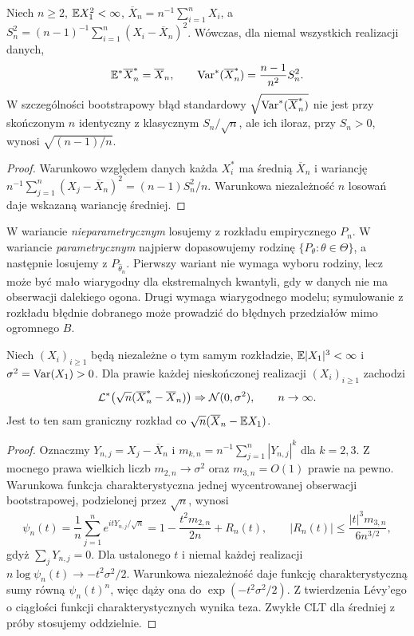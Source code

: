 \begin{twierdzenie}
\label{thm:bootstrap-mean-variance}
Niech $n\ge2$, $\mathbb E X_1^2<\infty$,
$\overline X_n=n^{-1}\sum_{i=1}^nX_i$, a
$S_n^2=(n-1)^{-1}\sum_{i=1}^n(X_i-\overline X_n)^2$.
Wówczas, dla niemal wszystkich realizacji danych,
\[
 \mathbb E^*\overline X_n^*=\overline X_n,\qquad
 \operatorname{Var}^*(\overline X_n^*)=\frac{n-1}{n^2}S_n^2.
\]
W szczególności bootstrapowy błąd standardowy $\sqrt{\operatorname{Var}^*(\overline X_n^*)}$
nie jest przy skończonym $n$ identyczny z klasycznym $S_n/\sqrt n$,
ale ich iloraz, przy $S_n>0$, wynosi $\sqrt{(n-1)/n}$.
\end{twierdzenie}
\begin{proof}
Warunkowo względem danych każda $X_i^*$ ma średnią
$\overline X_n$ i wariancję
$n^{-1}\sum_{j=1}^n(X_j-\overline X_n)^2=(n-1)S_n^2/n$.
Warunkowa niezależność $n$ losowań daje wskazaną wariancję średniej.
\end{proof}

\begin{uwaga}
W wariancie \emph{nieparametrycznym} losujemy z rozkładu empirycznego $P_n$.
W wariancie \emph{parametrycznym} najpierw dopasowujemy rodzinę
$\{P_\theta:\theta\in\Theta\}$, a następnie losujemy z
$P_{\widehat\theta_n}$. Pierwszy wariant nie wymaga wyboru rodziny,
lecz może być mało wiarygodny dla ekstremalnych kwantyli,
gdy w danych nie ma obserwacji dalekiego ogona. Drugi wymaga
wiarygodnego modelu; symulowanie z rozkładu błędnie dobranego
może prowadzić do błędnych przedziałów mimo ogromnego $B$.
\end{uwaga}

\begin{twierdzenie}
\label{thm:bootstrap-clt}
Niech $(X_i)_{i\ge1}$ będą niezależne o tym samym rozkładzie,
$\mathbb E|X_1|^3<\infty$ i $\sigma^2=\operatorname{Var}(X_1)>0$.
Dla prawie każdej nieskończonej realizacji $(X_i)_{i\ge1}$ zachodzi
\[
 \mathcal L^*\bigl(\sqrt n(\overline X_n^*-\overline X_n)\bigr)
 \Rightarrow\mathcal N(0,\sigma^2),\qquad n\to\infty.
\]
Jest to ten sam graniczny rozkład co $\sqrt n(\overline X_n-\mathbb E X_1)$.
\end{twierdzenie}
\begin{proof}
Oznaczmy $Y_{n,j}=X_j-\overline X_n$ i
$m_{k,n}=n^{-1}\sum_{j=1}^n|Y_{n,j}|^k$ dla $k=2,3$.
Z mocnego prawa wielkich liczb $m_{2,n}\to\sigma^2$
oraz $m_{3,n}=O(1)$ prawie na pewno.
Warunkowa funkcja charakterystyczna jednej wycentrowanej
obserwacji bootstrapowej, podzielonej przez $\sqrt n$, wynosi
\[
 \psi_n(t)=\frac1n\sum_{j=1}^n
 e^{itY_{n,j}/\sqrt n}
 =1-\frac{t^2m_{2,n}}{2n}+R_n(t),\qquad
 |R_n(t)|\le \frac{|t|^3m_{3,n}}{6n^{3/2}},
\]
gdyż $\sum_jY_{n,j}=0$. Dla ustalonego $t$ i niemal każdej
realizacji $n\log\psi_n(t)\to-t^2\sigma^2/2$.
Warunkowa niezależność daje funkcję charakterystyczną sumy
równą $\psi_n(t)^n$, więc dąży ona do
$\exp(-t^2\sigma^2/2)$. Z twierdzenia Lévy'ego
o ciągłości funkcji charakterystycznych wynika teza.
Zwykłe CLT dla średniej z próby stosujemy oddzielnie.
\end{proof}

